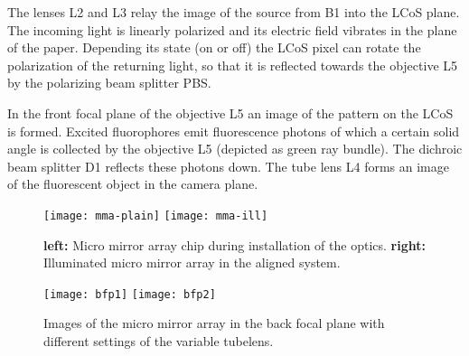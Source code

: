 The lenses L2 and L3 relay the image of the source from B1 into the
LCoS plane.  The incoming light is linearly polarized and its electric
field vibrates in the plane of the paper. Depending its state (on or
off) the LCoS pixel can rotate the polarization of the returning
light, so that it is reflected towards the objective L5 by the
polarizing beam splitter PBS.


In the front focal plane of the objective L5 an image of the pattern
on the LCoS is formed. Excited fluorophores emit fluorescence photons
of which a certain solid angle is collected by the objective L5
(depicted as green ray bundle). The dichroic beam splitter D1 reflects
these photons down. The tube lens L4 forms an image of the fluorescent
object in the camera plane.







\begin{figure}[!hbt]
  \centering
  \texttt{[image: mma-plain]}
  \texttt{[image: mma-ill]}
  \caption{{\bf left:} Micro mirror array chip during installation of
    the optics. {\bf right:} Illuminated micro mirror array in the
    aligned system.}
  \label{fig:mma-closeup}
\end{figure}

\begin{figure}[!hbt]
  \centering
  \texttt{[image: bfp1]}
  \texttt{[image: bfp2]}
  \caption{Images of the micro mirror array in the back focal plane
    with different settings of the variable tubelens.}
  \label{fig:mma-closeup}
\end{figure}


